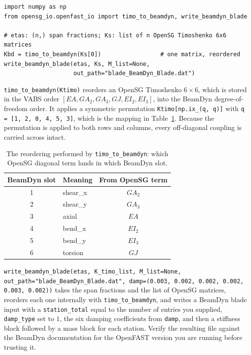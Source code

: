 \begin{lstlisting}[style=opensg,caption={Writing a BeamDyn blade input from a spanwise table of OpenSG 6x6 matrices.}]
import numpy as np
from opensg_io.openfast_io import timo_to_beamdyn, write_beamdyn_blade

# etas: (n,) span fractions; Ks: list of n OpenSG Timoshenko 6x6 matrices
Kbd = timo_to_beamdyn(Ks[0])                 # one matrix, reordered
write_beamdyn_blade(etas, Ks, M_list=None,
                    out_path="blade_BeamDyn_Blade.dat")
\end{lstlisting}

\texttt{timo\_to\_beamdyn(Ktimo)} reorders an OpenSG Timoshenko $6\times6$,
which is stored in the VABS order $[EA, GA_2, GA_3, GJ, EI_2, EI_3]$, into the
BeamDyn degree-of-freedom order. It applies a symmetric permutation
\texttt{Ktimo[np.ix\_(q, q)]} with \texttt{q = [1, 2, 0, 4, 5, 3]}, which is the
mapping in Table~\ref{tab:windio:bdorder}. Because the permutation is applied to
both rows and columns, every off-diagonal coupling is carried across intact.

\begin{table}[htbp]
\centering
\small
\caption{The reordering performed by \texttt{timo\_to\_beamdyn}: which OpenSG
         diagonal term lands in which BeamDyn slot.}
\label{tab:windio:bdorder}
\begin{tabular}{clc}
\toprule
BeamDyn slot & Meaning & From OpenSG term \\
\midrule
1 & shear\_x & $GA_2$ \\
2 & shear\_y & $GA_3$ \\
3 & axial & $EA$ \\
4 & bend\_x & $EI_2$ \\
5 & bend\_y & $EI_3$ \\
6 & torsion & $GJ$ \\
\bottomrule
\end{tabular}
\end{table}

\texttt{write\_beamdyn\_blade(etas, K\_timo\_list, M\_list=None,
out\_path="blade\_BeamDyn\_Blade.dat", damp=(0.003, 0.002, 0.002, 0.002, 0.003,
0.002))} takes the span fractions and the list of OpenSG matrices, reorders each
one internally with \texttt{timo\_to\_beamdyn}, and writes a BeamDyn blade input
with a \texttt{station\_total} equal to the number of entries you supplied,
\texttt{damp\_type} set to $1$, the six damping coefficients from
\texttt{damp}, and then a stiffness block followed by a mass block for each
station. Verify the resulting file against the BeamDyn documentation for the
OpenFAST version you are running before trusting it.

